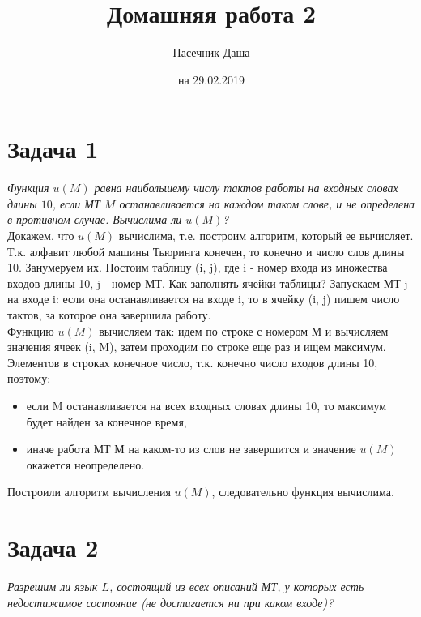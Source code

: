 \documentclass{article}
\title{Домашняя работа 2}
\author{Пасечник Даша}
\date{на 29.02.2019}
\begin{document}
\maketitle

\section*{Задача 1}

\textit{Функция $u(M)$ равна наибольшему числу тактов работы на входных словах длины $10$, если МТ $M$ останавливается на каждом таком слове, и не определена в противном случае. Вычислима ли $u(M)$?}\\

Докажем, что $u(M)$ вычислима, т.е. построим алгоритм, который ее вычисляет.\\
Т.к. алфавит любой машины Тьюринга конечен, то конечно и число слов длины 10. Занумеруем их. Постоим таблицу (i, j), где i - номер входа из множества входов длины 10, j - номер МТ. Как заполнять ячейки таблицы? Запускаем МТ j на входе i: если она останавливается на входе i, то в ячейку (i, j) пишем число тактов, за которое она завершила работу.\\
Функцию $u(M)$ вычисляем так: идем по строке с номером М и вычисляем значения ячеек (i, M), затем проходим по строке еще раз и ищем максимум. Элементов в строках конечное число, т.к. конечно число входов длины 10, поэтому:
\begin{itemize}
	\item если M останавливается на всех входных словах длины 10, то максимум будет найден за конечное время,
	\item иначе работа МТ М на каком-то из слов не завершится и значение $u(M)$ окажется неопределено.
\end{itemize} 
Построили алгоритм вычисления $u(M)$, следовательно функция вычислима.

\section*{Задача 2}

\textit{Разрешим ли язык $L$, состоящий из всех описаний МТ, у которых есть недостижимое состояние (не достигается ни при каком входе)?}\\
\end{document}
